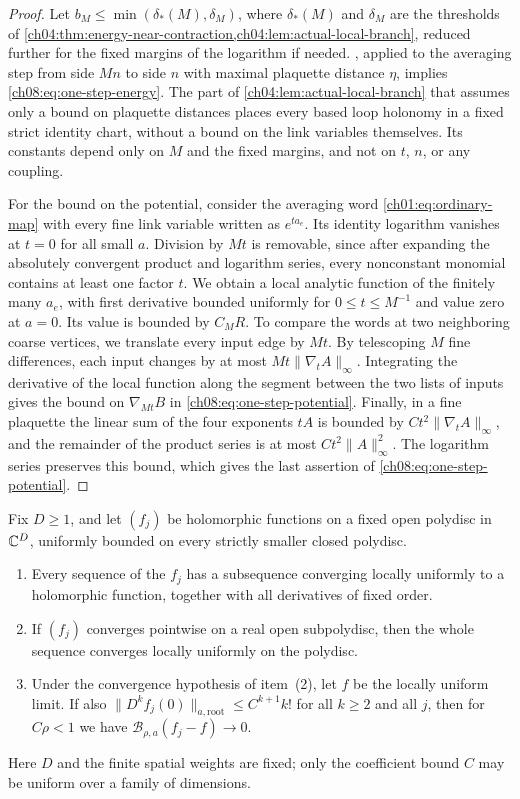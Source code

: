 \begin{proof}
Let $b_M\le\min(\delta_*(M),\delta_M)$, where $\delta_*(M)$ and $\delta_M$ are the thresholds of \cref{ch04:thm:energy-near-contraction,ch04:lem:actual-local-branch}, reduced further for the fixed margins of the logarithm if needed. , applied to the averaging step from side $Mn$ to side $n$ with maximal plaquette distance $\eta$, implies \eqref{ch08:eq:one-step-energy}. The part of \cref{ch04:lem:actual-local-branch} that assumes only a bound on plaquette distances places every based loop holonomy in a fixed strict identity chart, without a bound on the link variables themselves. Its constants depend only on $M$ and the fixed margins, and not on $t$, $n$, or any coupling.

For the bound on the potential, consider the averaging word \eqref{ch01:eq:ordinary-map} with every fine link variable written as $e^{ta_e}$. Its identity logarithm vanishes at $t=0$ for all small $a$. Division by $Mt$ is removable, since after expanding the absolutely convergent product and logarithm series, every nonconstant monomial contains at least one factor $t$. We obtain a local analytic function of the finitely many $a_e$, with first derivative bounded uniformly for $0\le t\le M^{-1}$ and value zero at $a=0$. Its value is bounded by $C_MR$. To compare the words at two neighboring coarse vertices, we translate every input edge by $Mt$. By telescoping $M$ fine differences, each input changes by at most $Mt\|\nabla_tA\|_\infty$. Integrating the derivative of the local function along the segment between the two lists of inputs gives the bound on $\nabla_{Mt}B$ in \eqref{ch08:eq:one-step-potential}. Finally, in a fine plaquette the linear sum of the four exponents $tA$ is bounded by $Ct^2\|\nabla_tA\|_\infty$, and the remainder of the product series is at most $Ct^2\|A\|_\infty^2$. The logarithm series preserves this bound, which gives the last assertion of \eqref{ch08:eq:one-step-potential}.
\end{proof}

\begin{lemma}\label{ch08:lem:analytic-compactness}
Fix $D\ge1$, and let $(f_j)$ be holomorphic functions on a fixed open polydisc in $\mathbb C^D$, uniformly bounded on every strictly smaller closed polydisc.
\begin{enumerate}
\item Every sequence of the $f_j$ has a subsequence converging locally uniformly to a holomorphic function, together with all derivatives of fixed order.
\item If $(f_j)$ converges pointwise on a real open subpolydisc, then the whole sequence converges locally uniformly on the polydisc.
\item Under the convergence hypothesis of item~(2), let $f$ be the locally uniform limit. If also $\|D^kf_j(0)\|_{a,\mathrm{root}}\le C^{k+1}k!$ for all $k\ge2$ and all $j$, then for $C\rho<1$ we have $\mathcal B_{\rho,a}(f_j-f)\to0$.
\end{enumerate}
Here $D$ and the finite spatial weights are fixed; only the coefficient bound $C$ may be uniform over a family of dimensions.
\end{lemma}

